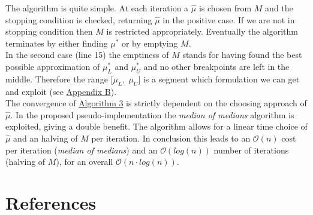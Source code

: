 \documentclass[12pt]{article}
\begin{document}
    \vspace{0.5cm}
	The algorithm is quite simple. At each iteration a $\hat{\mu}$ is chosen from $M$ and the stopping condition is checked, returning $\hat{\mu}$ in the positive case. If we are not in stopping condition then $M$ is restricted appropriately. Eventually the algorithm terminates by either finding $\mu^*$ or by emptying $M$.\\
	In the second case (line 15) the emptiness of $M$ stands for having found the best possible approximation of $\mu^*_L$ and $\mu^*_U$ and no other breakpoints are left in the middle. Therefore the range [$\mu_L,\;\mu_U$] is a segment which formulation we can get and exploit (see \hyperref[appendixB]{Appendix B}).\\
	\newline
	The convergence of \hyperref[algo:3]{Algorithm 3} is strictly dependent on the choosing approach of $\hat{\mu}$. In the proposed pseudo-implementation the \textit{median of medians} algorithm is exploited, giving a double benefit. The algorithm allows for a linear time choice of $\hat{\mu}$ and an halving of $M$ per iteration. In conclusion this leads to an $\mathcal{O}(n)$ cost per iteration (\textit{median of medians}) and an $\mathcal{O}(log(n))$ number of iterations (halving of $M$), for an overall $\mathcal{O}(n\cdot log(n))$.
	
    \pagebreak
    \section{References}
    \printbibliography[heading=none]
    \pagebreak
\end{document}
